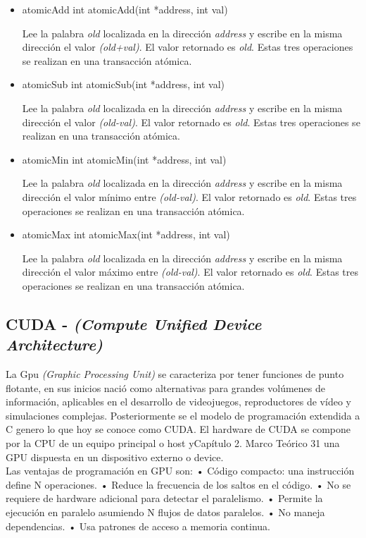 \begin{itemize}

	\item atomicAdd int atomicAdd(int *address, int val)

	Lee la palabra \textit{old} localizada en la dirección \textit{address} y escribe en la misma dirección el valor \textit{(old+val)}. El valor retornado es \textit{old}. Estas tres operaciones se realizan en una transacción atómica.

	\item atomicSub int atomicSub(int *address, int val)

	Lee la palabra \textit{old} localizada en la dirección \textit{address} y escribe en la misma dirección el valor \textit{(old-val)}. El valor retornado es \textit{old}. Estas tres operaciones se realizan en una transacción atómica.

	\item atomicMin int atomicMin(int *address, int val)

	Lee la palabra \textit{old} localizada en la dirección \textit{address} y escribe en la misma dirección el valor mínimo entre \textit{(old-val)}. El valor retornado es \textit{old}. Estas tres operaciones se realizan en una transacción atómica.

	 \item atomicMax int atomicMax(int *address, int val)

	Lee la palabra \textit{old} localizada en la dirección \textit{address} y escribe en la misma dirección el valor máximo entre \textit{(old-val)}. El valor retornado es \textit{old}. Estas tres operaciones se realizan en una transacción atómica.

\end{itemize}

\subsection{CUDA - \textit{(Compute Unified Device Architecture)}}

La Gpu \textit{(Graphic Processing Unit)} se caracteriza por tener funciones de punto flotante, en sus inicios nació como alternativas para grandes volúmenes de información, aplicables en el desarrollo de videojuegos, reproductores de vídeo y simulaciones complejas. Posteriormente se el modelo de programación extendida a C genero lo que hoy se conoce como CUDA. El hardware de CUDA se compone por la CPU de un equipo principal o host yCapítulo 2. Marco Teórico
31 una GPU dispuesta en un dispositivo externo o device.
\\
Las ventajas de programación en GPU son:
\subitem • Código compacto: una instrucción define N operaciones.
\subitem • Reduce la frecuencia de los saltos en el código.
\subitem • No se requiere de hardware adicional para detectar el paralelismo.
\subitem • Permite la ejecución en paralelo asumiendo N flujos de datos paralelos.
\subitem • No maneja dependencias.
\subitem • Usa patrones de acceso a memoria continua.
		
